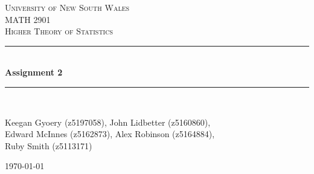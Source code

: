 \documentclass[a4paper]{article}
\begin{document}
\newlength{\strutheight}
\settoheight{\strutheight}{\strut}

\begin{titlepage}

\newcommand{\HRule}{\rule{\linewidth}{0.5mm}} %

\center %
 
\textsc{\LARGE University of New South Wales}\\[1.5cm] %
\textsc{\Large MATH 2901}\\[0.5cm] %
\textsc{\large Higher Theory of Statistics}\\[0.5cm] %

\HRule \\[0.4cm]
{ \huge \bfseries Assignment 2}\\[0.4cm] %
\HRule \\[1.5cm]


\begin{center} \large
Keegan Gyoery (z5197058), John Lidbetter (z5160860),\\ 
Edward McInnes (z5162873), Alex Robinson (z5164884),\\ 
Ruby Smith (z5113171) %
\\
\end{center}


\vspace{4cm}

{\today}\\[3cm] %

\vfill %

\end{titlepage}

\end{document}
